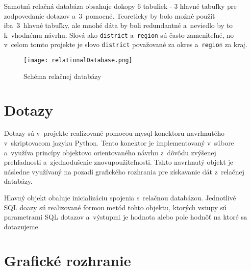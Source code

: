\documentclass [11pt, a4paper]{article}
\begin{document}
Samotná relačná databáza obsahuje dokopy 6 tabuliek - 3 hlavné tabuľky pre zodpovedanie dotazov a~3~pomocné. Teoreticky by bolo možné použiť iba~3~hlavné tabuľky, ale mnohé dáta by boli redundantné a~neviedlo by to k~vhodnému návrhu. Slová ako \texttt{district} a~\texttt{region} sú často zameniteľné, no v~celom tomto projekte je slovo \texttt{district} považované za okres a~\texttt{region} za kraj.

\begin{figure}[H]
\begin{center}
\texttt{[image: relationalDatabase.png]}
\caption{Schéma relačnej databázy}
\end{center}
\end{figure}

\section*{Dotazy}
Dotazy sú v~projekte realizované pomocou mysql konektoru navrhnutého v~skriptovacom jazyku Python. Tento konektor je implementovaný v~súbore  a~využíva princípy objektovo orientovaného návrhu z~dôvôdu zvýšenej prehľadnosti a~zjednodušenie znovupoužiteľnosti. Takto navrhnutý objekt je následne využívaný na pozadí grafického rozhrania pre získavanie dát z~relačnej databázy.

Hlavný objekt obaluje inicializáciu spojenia s~relačnou databázou. Jednotlivé SQL doazy sú realizované formou metód tohto objektu, ktorých vstupy sú parametrami SQL dotazov a~výstupmi je hodnota alebo pole hodnôť na ktoré sa dotazujeme.

\section*{Grafické rozhranie}
\end{document}
